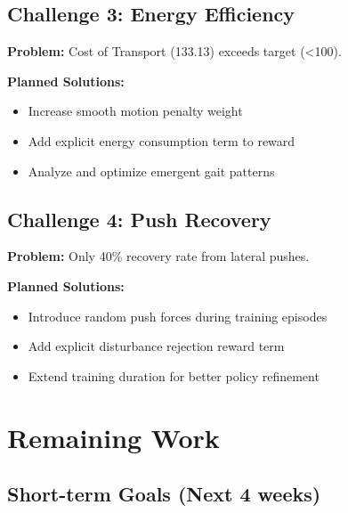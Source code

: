 \documentclass[12pt,a4paper]{article}
\begin{document}
\subsection{Challenge 3: Energy Efficiency}

\textbf{Problem:} Cost of Transport (133.13) exceeds target (<100).

\textbf{Planned Solutions:}
\begin{itemize}
    \item Increase smooth motion penalty weight
    \item Add explicit energy consumption term to reward
    \item Analyze and optimize emergent gait patterns
\end{itemize}

\subsection{Challenge 4: Push Recovery}

\textbf{Problem:} Only 40\% recovery rate from lateral pushes.

\textbf{Planned Solutions:}
\begin{itemize}
    \item Introduce random push forces during training episodes
    \item Add explicit disturbance rejection reward term
    \item Extend training duration for better policy refinement
\end{itemize}

\section{Remaining Work}

\subsection{Short-term Goals (Next 4 weeks)}
\end{document}
